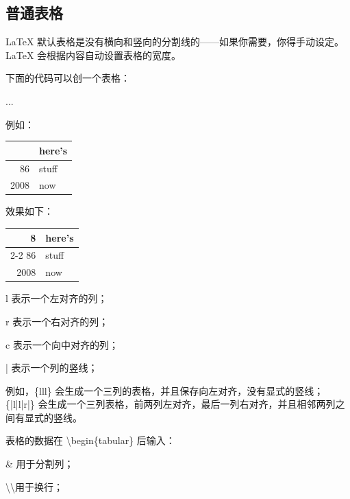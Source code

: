 \subsection{普通表格}

LaTeX 默认表格是没有横向和竖向的分割线的——如果你需要，你得手动设定。LaTeX 会根据内容自动设置表格的宽度。

下面的代码可以创一个表格：

\begin{python}
\begin{tabular}{...}
\end{tabular}
\end{python}

例如：

\begin{python}
\begin{center}
\begin{tabular}{|r|l|}
	\centering
	\hline
	8              & here's \\
	\cline 86 & stuff  \\
	\hline
	\hline
	2008           & now    \\
	\hline
\end{tabular}
\end{center}
\end{python}

效果如下：

\begin{center}
\begin{tabular}{|r|l|}
	\hline
	8              & here's \\
	\cline{2-2}
	86 & stuff  \\
	\hline
	2008           & now    \\
	\hline
\end{tabular}
\end{center}

l 表示一个左对齐的列；

r 表示一个右对齐的列；

c 表示一个向中对齐的列；

| 表示一个列的竖线；

例如，\{lll\} 会生成一个三列的表格，并且保存向左对齐，没有显式的竖线；\{|l|l|r|\} 会生成一个三列表格，前两列左对齐，最后一列右对齐，并且相邻两列之间有显式的竖线。

表格的数据在 \textbackslash begin\{tabular\} 后输入：

\& 用于分割列；

\textbackslash \textbackslash 用于换行；

